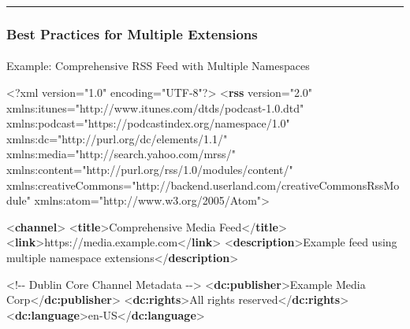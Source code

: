 \documentclass[
  letterpaper,
  DIV=11,
  numbers=noendperiod]{scrartcl}
\makeatletter
\let\oldparagraph\paragraph
\renewcommand{\paragraph}{
    \@ifstar
      \xxxParagraphStar
      \xxxParagraphNoStar
  }
\newcommand{\xxxParagraphStar}[1]{\oldparagraph*{#1}\mbox{}}
\newcommand{\xxxParagraphNoStar}[1]{\oldparagraph{#1}\mbox{}}
\newenvironment{Shaded}{\begin{snugshade}}{\end{snugshade}}
\newcommand{\CommentTok}[1]{\textcolor[rgb]{0.37,0.37,0.37}{#1}}
\newcommand{\FunctionTok}[1]{\textcolor[rgb]{0.28,0.35,0.67}{#1}}
\newcommand{\KeywordTok}[1]{\textcolor[rgb]{0.00,0.23,0.31}{\textbf{#1}}}
\newcommand{\NormalTok}[1]{\textcolor[rgb]{0.00,0.23,0.31}{#1}}
\newcommand{\OtherTok}[1]{\textcolor[rgb]{0.00,0.23,0.31}{#1}}
\newcommand{\StringTok}[1]{\textcolor[rgb]{0.13,0.47,0.30}{#1}}
\makeatother
\begin{document}
\begin{center}\rule{0.5\linewidth}{0.5pt}\end{center}

\subsubsection{Best Practices for Multiple
Extensions}\label{best-practices-for-multiple-extensions}

\paragraph{Example: Comprehensive RSS Feed with Multiple
Namespaces}\label{example-comprehensive-rss-feed-with-multiple-namespaces}

\begin{Shaded}
\begin{Highlighting}[]
\FunctionTok{\textless{}?xml}\OtherTok{ version=}\StringTok{"1.0"}\OtherTok{ encoding=}\StringTok{"UTF{-}8"}\FunctionTok{?\textgreater{}}
\NormalTok{\textless{}}\KeywordTok{rss}\OtherTok{ version=}\StringTok{"2.0"} 
\OtherTok{   xmlns:itunes=}\StringTok{"http://www.itunes.com/dtds/podcast{-}1.0.dtd"}
\OtherTok{     xmlns:podcast=}\StringTok{"https://podcastindex.org/namespace/1.0"}
\OtherTok{     xmlns:dc=}\StringTok{"http://purl.org/dc/elements/1.1/"}
\OtherTok{     xmlns:media=}\StringTok{"http://search.yahoo.com/mrss/"}
\OtherTok{     xmlns:content=}\StringTok{"http://purl.org/rss/1.0/modules/content/"}
\OtherTok{     xmlns:creativeCommons=}\StringTok{"http://backend.userland.com/creativeCommonsRssModule"}
\OtherTok{     xmlns:atom=}\StringTok{"http://www.w3.org/2005/Atom"}\NormalTok{\textgreater{}}
  
\NormalTok{  \textless{}}\KeywordTok{channel}\NormalTok{\textgreater{}}
\NormalTok{\textless{}}\KeywordTok{title}\NormalTok{\textgreater{}Comprehensive Media Feed\textless{}/}\KeywordTok{title}\NormalTok{\textgreater{}}
\NormalTok{    \textless{}}\KeywordTok{link}\NormalTok{\textgreater{}https://media.example.com\textless{}/}\KeywordTok{link}\NormalTok{\textgreater{}}
\NormalTok{    \textless{}}\KeywordTok{description}\NormalTok{\textgreater{}Example feed using multiple namespace extensions\textless{}/}\KeywordTok{description}\NormalTok{\textgreater{}}
    
    \CommentTok{\textless{}!{-}{-} Dublin Core Channel Metadata {-}{-}\textgreater{}}
\NormalTok{    \textless{}}\KeywordTok{dc:publisher}\NormalTok{\textgreater{}Example Media Corp\textless{}/}\KeywordTok{dc:publisher}\NormalTok{\textgreater{}}
\NormalTok{    \textless{}}\KeywordTok{dc:rights}\NormalTok{\textgreater{}All rights reserved\textless{}/}\KeywordTok{dc:rights}\NormalTok{\textgreater{}}
\NormalTok{\textless{}}\KeywordTok{dc:language}\NormalTok{\textgreater{}en{-}US\textless{}/}\KeywordTok{dc:language}\NormalTok{\textgreater{}}
    

\end{Highlighting}
\end{Shaded}
\end{document}
